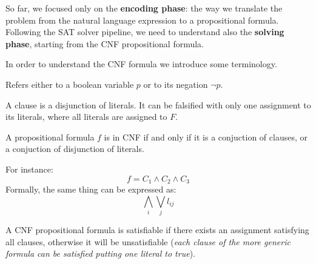 So far, we focused only on the \textbf{encoding phase}: the way we translate the problem from the natural language expression to a propositional formula.
Following the SAT solver pipeline, we need to understand also the \textbf{solving phase}, starting from the CNF propositional formula. \vspace{7pt}

In order to understand the CNF formula we introduce some terminology.
\begin{definition}[title = Literal]
    Refers either to a boolean variable $p$ or to its negation $\neg p$.
\end{definition}
\begin{definition}[title = Clause]
    A clause is a disjunction of literals. It can be falsified with only one assignment to its literals, where all literals are assigned 
    to $F$.
\end{definition}
\begin{definition}[title = CNF propositional formula]
    A propositional formula $f$ is in CNF if and only if it is a conjuction of clauses, or a conjuction of disjunction of literals. \vspace{7pt}

    For instance:
    $$ f = C_1 \wedge C_2 \wedge C_3 $$
    Formally, the same thing can be expressed as:
    $$ \bigwedge_{i} \bigvee_{j} l_{ij} $$

    A CNF propositional formula is satisfiable if there exists an assignment satisfying all clauses, otherwise it will be unsatisfiable (\textit{each clause
    of the more generic formula can be satisfied putting one literal to true}).
\end{definition}